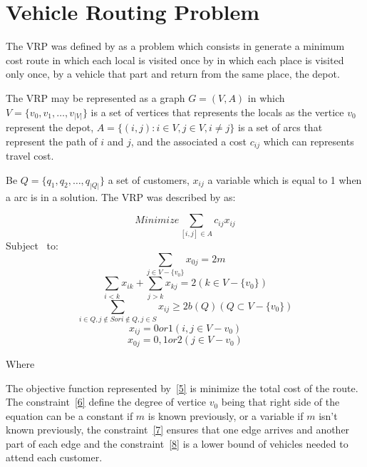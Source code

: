 \section{Vehicle Routing Problem}

The \ac{VRP} was defined by  as a problem which consists in generate a minimum cost route in which each local is visited once by in which each place is visited only once, by a vehicle that part and return from the same place, the depot.

The \ac{VRP} may be represented as a graph $G = (V,A)$ in which $V = \{v_0,v_1,\ldots,v_{|V|} \}$ is a set of vertices that represents the locals as the vertice $v_0$ represent the depot, $A = \{(i,j) : i\in V, j \in V, i \neq j \}$ is a set of arcs that represent the path of $i$ and $j$, and the associated a cost $c_{ij}$ which can represents travel cost.

Be  $Q = \{ q_1, q_2, \ldots, q_{|Q|} \}$ a set of customers, $x_{ij}$  a variable which is equal to 1 when a arc is in a solution. The \ac{VRP} was described by  as:

\begin{equation}\label{5}
Minimize \sum_{[i,j] \in A} c_{ij}x_{ij}
\end{equation}
Subject \ to:
\begin{equation}\label{6}
\sum_{j \in V-\{v_0\}} x_{0j} = 2m
\end{equation}
\begin{equation}\label{7}
\sum_{i<k} x_{ik} + \sum_{j>k} x_{kj} = 2 (k \in V-\{v_0\})
\end{equation}
\begin{equation}\label{8}
\sum_{i \in Q, j \notin S or i \notin Q, j \in S } x_{ij} \geqslant 2b(Q) (Q \subset V-\{v_0\})
\end{equation}
\begin{equation}\label{9}
x_{ij} = 0 or 1 (i,j \in V-{v_0})
\end{equation}
\begin{equation}\label{10}
x_{0j} = 0, 1 or 2 (j \in V-{v_0})
\end{equation}

Where

The objective function represented by~\ref{5} is minimize the total cost of the route. The constraint~\ref{6} define the degree of vertice  $v_0$ being that right side of the equation can be a constant if $m$ is known previously, or a variable if $m$ isn't known previously, the constraint~\ref{7} ensures that one edge arrives and another part of each edge and the constraint~\ref{8} is a lower bound of vehicles needed to attend each customer.

